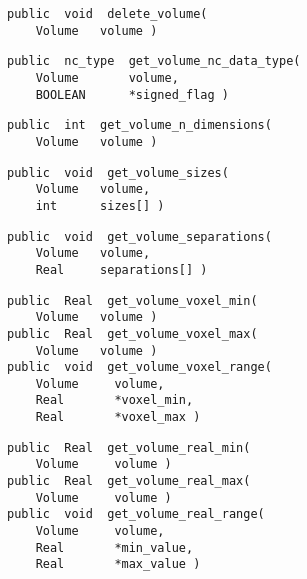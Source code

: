 {\bf\begin{verbatim}
public  void  delete_volume(
    Volume   volume )
\end{verbatim}}


{\bf\begin{verbatim}
public  nc_type  get_volume_nc_data_type(
    Volume       volume,
    BOOLEAN      *signed_flag )
\end{verbatim}}


{\bf\begin{verbatim}
public  int  get_volume_n_dimensions(
    Volume   volume )
\end{verbatim}}


{\bf\begin{verbatim}
public  void  get_volume_sizes(
    Volume   volume,
    int      sizes[] )
\end{verbatim}}


{\bf\begin{verbatim}
public  void  get_volume_separations(
    Volume   volume,
    Real     separations[] )
\end{verbatim}}


{\bf\begin{verbatim}
public  Real  get_volume_voxel_min(
    Volume   volume )
public  Real  get_volume_voxel_max(
    Volume   volume )
public  void  get_volume_voxel_range(
    Volume     volume,
    Real       *voxel_min,
    Real       *voxel_max )
\end{verbatim}}


{\bf\begin{verbatim}
public  Real  get_volume_real_min(
    Volume     volume )
public  Real  get_volume_real_max(
    Volume     volume )
public  void  get_volume_real_range(
    Volume     volume,
    Real       *min_value,
    Real       *max_value )
\end{verbatim}}

